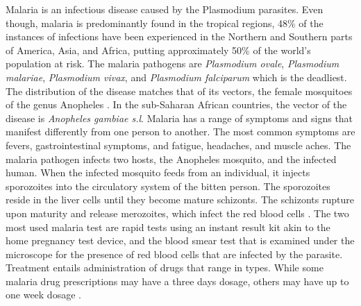Malaria is an infectious disease caused by the Plasmodium parasites. Even though, malaria is predominantly found in the tropical regions, 48\% of the instances of infections have been experienced in the Northern and Southern parts of America, Asia, and Africa, putting approximately 50\% of the world’s population at risk. The malaria pathogens are \textit{Plasmodium ovale}, \textit{Plasmodium malariae}, \textit{Plasmodium vivax}, and \textit{Plasmodium falciparum} which is the deadliest. The distribution of the disease matches that of its vectors, the female mosquitoes of the genus Anopheles \cite{sinka_global_2012,snow_global_2005}. In the sub-Saharan African countries, the vector of the disease is \textit{Anopheles gambiae s.l}. Malaria has a range of symptoms and signs that manifest differently from one person to another. The most common symptoms are fevers, gastrointestinal symptoms, and fatigue, headaches, and muscle aches. The malaria pathogen infects two hosts, the Anopheles mosquito, and the infected human. When the infected mosquito feeds from an individual, it injects sporozoites into the circulatory system of the bitten person. The sporozoites reside in the liver cells until they become mature schizonts. The schizonts rupture upon maturity and release merozoites, which infect the red blood cells \cite{james_new_1937}. The two most used malaria test are rapid tests using an instant result kit akin to the home pregnancy test device, and the blood smear test that is examined under the microscope for the presence of red blood cells that are infected by the parasite. Treatment entails administration of drugs that range in types. While some malaria drug prescriptions may have a three days dosage, others may have up to one week dosage \cite{alonso_malaria_1993,battle_treatment-seeking_2016}.

